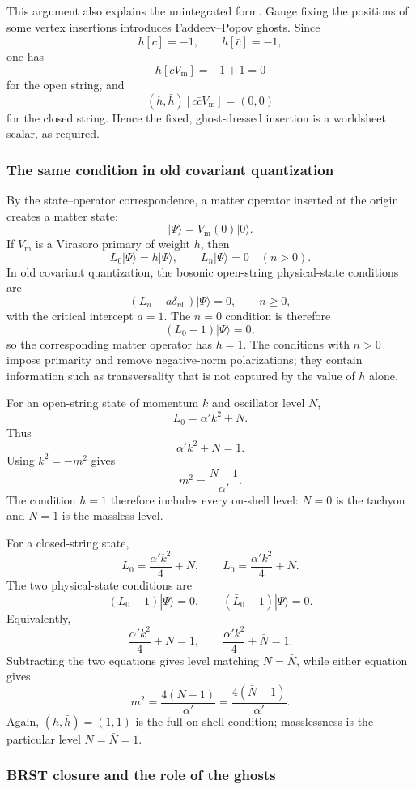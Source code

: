 \documentclass[
  10pt,
  a4paper,
  openany]{book}
\begin{document}
This argument also explains the unintegrated form. Gauge fixing the
positions of some vertex insertions introduces Faddeev--Popov ghosts.
Since \[
h[c]=-1,
\qquad
\bar h[\bar c]=-1,
\] one has \[
h[cV_{\mathrm m}]=-1+1=0
\] for the open string, and \[
(h,\bar h)[c\bar cV_{\mathrm m}]=(0,0)
\] for the closed string. Hence the fixed, ghost-dressed insertion is a
worldsheet scalar, as required.

\subsubsection{The same condition in old covariant
quantization}\label{the-same-condition-in-old-covariant-quantization}

By the state--operator correspondence, a matter operator inserted at the
origin creates a matter state: \[
|\Psi\rangle=V_{\mathrm m}(0)|0\rangle.
\] If \(V_{\mathrm m}\) is a Virasoro primary of weight \(h\), then \[
L_0|\Psi\rangle=h|\Psi\rangle,
\qquad
L_n|\Psi\rangle=0
\quad(n>0).
\] In old covariant quantization, the bosonic open-string physical-state
conditions are \[
(L_n-a\delta_{n0})|\Psi\rangle=0,
\qquad n\geq0,
\] with the critical intercept \(a=1\). The \(n=0\) condition is
therefore \[
(L_0-1)|\Psi\rangle=0,
\] so the corresponding matter operator has \(h=1\). The conditions with
\(n>0\) impose primarity and remove negative-norm polarizations; they
contain information such as transversality that is not captured by the
value of \(h\) alone.

For an open-string state of momentum \(k\) and oscillator level \(N\),
\[
L_0=\alpha'k^2+N.
\] Thus \[
\alpha'k^2+N=1.
\] Using \(k^2=-m^2\) gives \[
m^2=\frac{N-1}{\alpha'}.
\] The condition \(h=1\) therefore includes every on-shell level:
\(N=0\) is the tachyon and \(N=1\) is the massless level.

For a closed-string state, \[
L_0=\frac{\alpha'k^2}{4}+N,
\qquad
\bar L_0=\frac{\alpha'k^2}{4}+\bar N.
\] The two physical-state conditions are \[
(L_0-1)|\Psi\rangle=0,
\qquad
(\bar L_0-1)|\Psi\rangle=0.
\] Equivalently, \[
\frac{\alpha'k^2}{4}+N=1,
\qquad
\frac{\alpha'k^2}{4}+\bar N=1.
\] Subtracting the two equations gives level matching \(N=\bar N\),
while either equation gives \[
m^2=\frac{4(N-1)}{\alpha'}
=\frac{4(\bar N-1)}{\alpha'}.
\] Again, \((h,\bar h)=(1,1)\) is the full on-shell condition;
masslessness is the particular level \(N=\bar N=1\).

\subsubsection{BRST closure and the role of the
ghosts}\label{brst-closure-and-the-role-of-the-ghosts}
\end{document}
